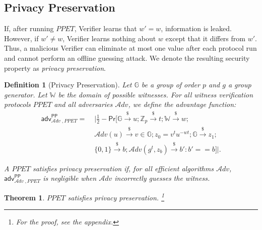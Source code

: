 \documentclass[letterpaper,twocolumn,10pt]{article}
\newcommand{\alg}[1]{\mathsf{#1}}
\newcommand{\adv}{\mathcal{A}dv}
\newcommand{\PR}{\mathsf{Pr}}
\newcommand{\riar}{\xrightarrow{\$}}
\newcommand{\ZZ}{\mathbb{Z}}
\newcommand{\WW}{\mathbb{W}}
\newcommand{\GG}{\mathbb{G}}
\newcommand{\advantage}[2]{\alg{adv}^{#1}_{\adv\;\!,#2}}
\newtheorem{definition}{Definition}
\newtheorem{theorem}{Theorem}
\begin{document}
\subsection{Privacy Preservation}
%
If, after running $\mathit{PPET}$, Verifier learns that $w'=w$, information is leaked.
However, if $w'\neq w$, Verifier learns nothing about $w$ except that it differs from $w'$.
Thus, a malicious Verifier can eliminate at most one value after each protocol
run and cannot perform an offline guessing attack. We denote the resulting security property
as \emph{privacy preservation}.
%

\begin{definition}[Privacy Preservation]
\label{def:witn-indist}
  Let $\GG$ be a group of order $p$ and $g$ a group generator.
  Let $\WW$ be the domain of possible witnesses.
  For all witness verification protocols $\mathit{PPET}$ and all adversaries $\adv$,
  we define the advantage function:
  \begin{equation*}
    \begin{split}
      \advantage{\mathsf{PP}}{\mathit{PPET}} = \; & \Big| \frac{1}{2} - \PR \big[ \GG \riar u; \ZZ_p \riar t; \WW \riar w; \\
       & \adv(u) \riar v \in \GG; z_0 = v^t u^{-wt}; \GG \riar z_1; \\
    & \{0, 1\} \riar b; \adv(g^t, z_b) \riar b': b' == b \big] \Big|.
    \end{split}
  \end{equation*}

A $\mathit{PPET}$ satisfies privacy preservation if, for all efficient algorithms $\adv$,
$\advantage{\mathsf{PP}}{\mathit{PPET}}$ is negligible when $\adv$ incorrectly guesses the witness.
\end{definition}

\begin{theorem}
\label{thm:privacy-preservation}
   $\mathit{PPET}$ satisfies privacy preservation. \footnote{For the proof, see the appendix.}
\end{theorem}
\end{document}
